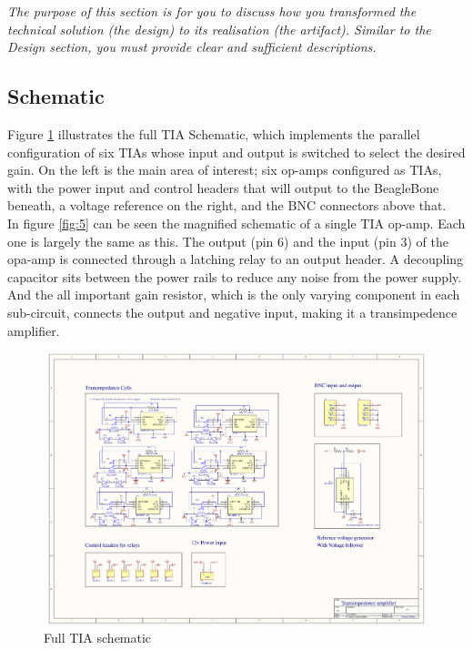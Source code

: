 \documentclass[conference]{IEEEtran}
\begin{document}
\textit{The purpose of this section is for you to discuss how you transformed the technical solution (the design) to its realisation (the artifact). Similar to the Design section, you must provide clear and sufficient descriptions.} \\

\subsection{Schematic}

Figure \ref{fig:4} illustrates the full TIA Schematic, which implements the parallel configuration of six TIAs whose input and output is switched to select the desired gain. On the left is the main area of interest; six op-amps configured as TIAs, with the power input and control headers that will output to the BeagleBone beneath, a voltage reference on the right, and the BNC connectors above that. \\

In figure \ref{fig:5} can be seen the magnified schematic of a single TIA op-amp. Each one is largely the same as this. The output (pin 6) and the input (pin 3) of the opa-amp is connected through a latching relay to an output header. A decoupling capacitor sits between the power rails to reduce any noise from the power supply. And the all important gain resistor, which is the only varying component in each sub-circuit, connects the output and negative input, making it a transimpedence amplifier. 

\begin{figure}
    \centering
    \includegraphics[width=\linewidth]{Amp_schem.pdf}
    \caption{Full TIA schematic}
    \label{fig:4}
\end{figure}
\end{document}
